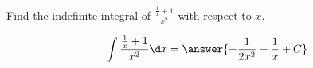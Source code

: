 \documentclass{ximera}
\author{Gregory Hartman \and Matthew Carr}
\begin{document}
\begin{exercise}

Find the indefinite integral of $\frac{\frac{1}{x}+1}{x^2}$ with respect to $x$.

\[
\int \frac{\frac{1}{x}+1}{x^2}\d x=\answer{-\frac{1}{2 x^2}-\frac{1}{x}+C}
\]

\end{exercise}
\end{document}
